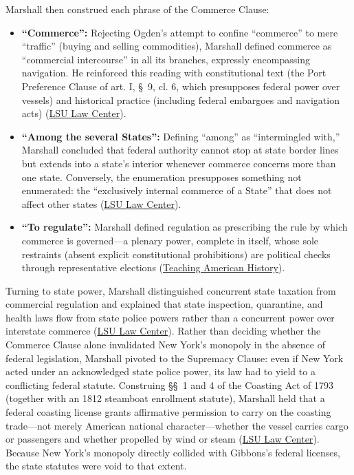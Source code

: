 \documentclass[12pt]{article}
\begin{document}
Marshall then construed each phrase of the Commerce Clause:
\begin{itemize}
\item \textbf{``Commerce'':} Rejecting Ogden's attempt to confine ``commerce'' to mere ``traffic'' (buying and selling commodities), Marshall defined commerce as ``commercial intercourse'' in all its branches, expressly encompassing navigation. He reinforced this reading with constitutional text (the Port Preference Clause of art. I, \S~9, cl. 6, which presupposes federal power over vessels) and historical practice (including federal embargoes and navigation acts) (\href{https://biotech.law.lsu.edu/cases/pp/Gibbons.htm}{LSU Law Center}).
\item \textbf{``Among the several States'':} Defining ``among'' as ``intermingled with,'' Marshall concluded that federal authority cannot stop at state border lines but extends into a state's interior whenever commerce concerns more than one state. Conversely, the enumeration presupposes something not enumerated: the ``exclusively internal commerce of a State'' that does not affect other states (\href{https://biotech.law.lsu.edu/cases/pp/Gibbons.htm}{LSU Law Center}).
\item \textbf{``To regulate'':} Marshall defined regulation as prescribing the rule by which commerce is governed---a plenary power, complete in itself, whose sole restraints (absent explicit constitutional prohibitions) are political checks through representative elections (\href{https://teachingamericanhistory.org/document/gibbons-v-ogden/}{Teaching American History}).
\end{itemize}

Turning to state power, Marshall distinguished concurrent state taxation from commercial regulation and explained that state inspection, quarantine, and health laws flow from state police powers rather than a concurrent power over interstate commerce (\href{https://biotech.law.lsu.edu/cases/pp/Gibbons.htm}{LSU Law Center}). Rather than deciding whether the Commerce Clause alone invalidated New York's monopoly in the absence of federal legislation, Marshall pivoted to the Supremacy Clause: even if New York acted under an acknowledged state police power, its law had to yield to a conflicting federal statute. Construing \S\S~1 and 4 of the Coasting Act of 1793 (together with an 1812 steamboat enrollment statute), Marshall held that a federal coasting license grants affirmative permission to carry on the coasting trade---not merely American national character---whether the vessel carries cargo or passengers and whether propelled by wind or steam (\href{https://biotech.law.lsu.edu/cases/pp/Gibbons.htm}{LSU Law Center}). Because New York's monopoly directly collided with Gibbons's federal licenses, the state statutes were void to that extent.
\end{document}
